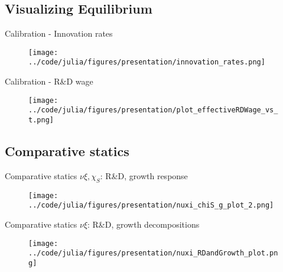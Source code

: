 \documentclass[english,usenames,dvipsnames]{beamer}
\begin{document}
\subsection{Visualizing Equilibrium}


\begin{frame}[label = innovation_rates]{Calibration - Innovation rates}\hyperlink{incumbent_value}{} \hyperlink{spinout_value}{} \hyperlink{stationary_distribution_m}{} \hyperlink{stationary_distribution_t}{}
\begin{figure}
	\texttt{[image: ../code/julia/figures/presentation/innovation\_rates.png]}
\end{figure}
\end{frame}

\begin{frame}{Calibration - R\&D wage}
\begin{figure}
	\texttt{[image: ../code/julia/figures/presentation/plot\_effectiveRDWage\_vs\_t.png]}
\end{figure}
\end{frame}

\subsection{Comparative statics}

\begin{frame}{Comparative statics $\nu \xi, \chi_S$: R\&D, growth response}
\begin{figure}
	\texttt{[image: ../code/julia/figures/presentation/nuxi\_chiS\_g\_plot\_2.png]}
\end{figure}
\end{frame}

\begin{frame}{Comparative statics $\nu \xi$: R\&D, growth decompositions}
\begin{figure}
	\texttt{[image: ../code/julia/figures/presentation/nuxi\_RDandGrowth\_plot.png]}
\end{figure}
\end{frame}
\end{document}

